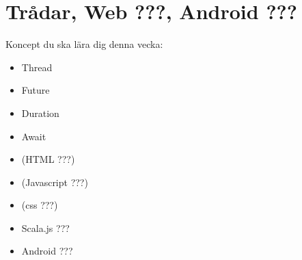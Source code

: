 \chapter{Trådar, Web ???, Android ???}\label{chapter:W12}
Koncept du ska lära dig denna vecka:
\begin{multicols}{2}\begin{itemize}[nosep,label={$\square$},leftmargin=*]
\item Thread
\item Future
\item Duration
\item Await
\item (HTML ???)
\item (Javascript ???)
\item (css ???)
\item Scala.js ???
\item Android ???\end{itemize}\end{multicols}
